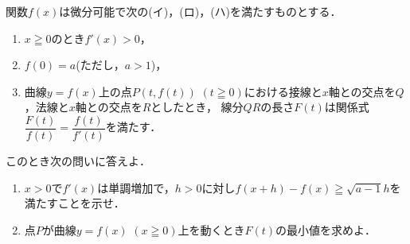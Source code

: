 \documentclass[../../main.tex]{subfiles}
\begin{document}
関数$f(x)$は微分可能で次の(イ)，(ロ)，(ハ)を満たすものとする．
\begin{enumerate}
  \item[(イ)] $x \geqq 0$のとき$f'(x)>0$，
  \item[(ロ)] $f(0)=a$(ただし，$a>1$)，
  \item[(ハ)] 曲線$y=f(x)$上の点$P(t,f(t))$ $(t \geqq 0)$における接線と$x$軸との交点を$Q$，法線と$x$軸との交点を$R$としたとき，
    線分$QR$の長さ$F(t)$は関係式$\displaystyle \dfrac{F(t)}{f(t)} = \dfrac{f(t)}{f'(t)}$を満たす．
\end{enumerate}
このとき次の問いに答えよ．
\begin{enumerate}
  \item $x>0$で$f'(x)$は単調増加で，$h>0$に対し$f(x+h)-f(x) \geqq \sqrt{a-1}h$を満たすことを示せ．
  \item 点$P$が曲線$y=f(x)$ $(x \geqq 0)$上を動くとき$F(t)$の最小値を求めよ．
\end{enumerate}
\end{document}
